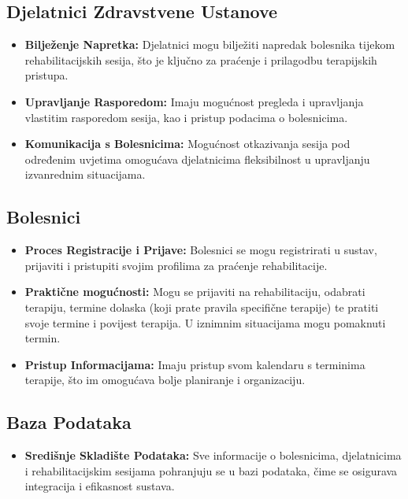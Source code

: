         \subsection*{Djelatnici Zdravstvene Ustanove}
        \begin{itemize}
            \item \textbf{Bilježenje Napretka:} Djelatnici mogu bilježiti napredak bolesnika tijekom rehabilitacijskih sesija, što je ključno za praćenje i prilagodbu terapijskih pristupa.
        
            \item \textbf{Upravljanje Rasporedom:} Imaju mogućnost pregleda i upravljanja vlastitim rasporedom sesija, kao i pristup podacima o bolesnicima.
        
            \item \textbf{Komunikacija s Bolesnicima:} Mogućnost otkazivanja sesija pod određenim uvjetima omogućava djelatnicima fleksibilnost u upravljanju izvanrednim situacijama.
        \end{itemize}
        
        \subsection*{Bolesnici}
        \begin{itemize}
            \item \textbf{Proces Registracije i Prijave:} Bolesnici se mogu registrirati u sustav, prijaviti i pristupiti svojim profilima za praćenje rehabilitacije.
        
            \item \textbf{Praktične mogućnosti:} Mogu se prijaviti na rehabilitaciju, odabrati terapiju, termine dolaska (koji prate pravila specifične terapije) te pratiti svoje termine i povijest terapija. U iznimnim situacijama mogu pomaknuti termin. 
        
            \item \textbf{Pristup Informacijama:} Imaju pristup svom kalendaru s terminima terapije, što im omogućava bolje planiranje i organizaciju.
        \end{itemize}
        
        \subsection*{Baza Podataka}
        \begin{itemize}
            \item \textbf{Središnje Skladište Podataka:} Sve informacije o bolesnicima, djelatnicima i rehabilitacijskim sesijama pohranjuju se u bazi podataka, čime se osigurava integracija i efikasnost sustava.
        \end{itemize}
        
